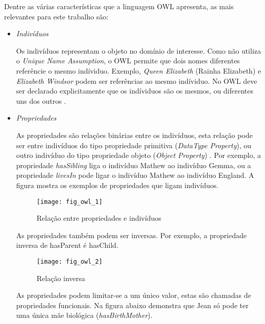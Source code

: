 Dentre as várias características que a linguagem OWL apresenta, as mais 
relevantes para este trabalho são:

\begin{itemize}
    
    \item \textit{Indivíduos}
    
    Os indivíduos representam o objeto no domínio de interesse. Como não 
    utiliza o \textit{Unique Name Assumption}, o OWL permite que dois nomes 
    diferentes referêncie o mesmo indíviduo. Exemplo, \textit{Queen Elizabeth} 
    (Rainha Elizabeth) e \textit{Elizabeth Windsor} podem ser referências ao 
    mesmo indíviduo. No OWL deve ser declarado explicitamente que os indíviduos 
    são os mesmos, ou diferentes uns dos outros \cite{horridge2004practical}.
    
    \item \textit{Propriedades}
    
    As propriedades são relações binárias entre os indivíduos, esta relação pode 
    ser entre indivíduos do tipo propriedade primitiva 
    (\textit{DataType Property}), ou outro indivíduo do tipo propriedade objeto 
    (\textit{Object Property}) \cite{horridge2004practical}. Por exemplo, a 
    propriedade \textit{hasSibling} liga o indivíduo Mathew ao indivíduo Gemma, 
    ou a propriedade \textit{livesIn} pode ligar o indivíduo Mathew ao indivíduo 
    England. A figura mostra os exemplos de propriedades que ligam indivíduos.
    
    \begin{figure}[!h]
      \centering
      \texttt{[image: fig\_owl\_1]} 
      \caption{Relação entre propriedades e indivíduos}
      \label{fig:fig_owl_1} 
    \end{figure}

    As propriedades também podem ser inversas. Por exemplo, a propriedade 
    inversa de hasParent é hasChild.
    
    \begin{figure}[!h]
      \centering
      \texttt{[image: fig\_owl\_2]} 
      \caption{Relação inversa}
      \label{fig:fig_owl_2} 
    \end{figure}

    \vskip 4cm
    
    As propriedades podem limitar-se a um único valor, estas são chamadas de 
    propriedades funcionais. Na figura abaixo demonstra que Jean só pode ter 
    uma única mãe biológica (\textit{hasBirthMother}).
    

\end{itemize}
